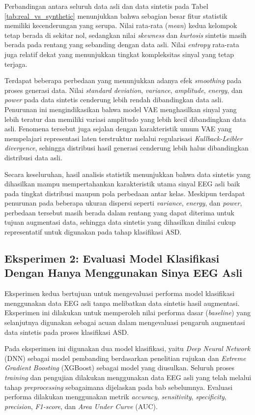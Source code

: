 Perbandingan antara seluruh data asli dan data sintetis pada Tabel \ref{tab:real_vs_synthetic} menunjukkan bahwa sebagian besar fitur statistik memiliki kecenderungan yang serupa. Nilai rata-rata (\textit{mean}) kedua kelompok tetap berada di sekitar nol, sedangkan nilai \textit{skewness} dan \textit{kurtosis} sintetis masih berada pada rentang yang sebanding dengan data asli. Nilai \textit{entropy} rata-rata juga relatif dekat yang menunjukkan tingkat kompleksitas sinyal yang tetap terjaga.

Terdapat beberapa perbedaan yang menunjukkan adanya efek \textit{smoothing} pada proses generasi data. Nilai \textit{standard deviation}, \textit{variance}, \textit{amplitude}, \textit{energy}, dan \textit{power} pada data sintetis cenderung lebih rendah dibandingkan data asli. Penurunan ini mengindikasikan bahwa model VAE menghasilkan sinyal yang lebih teratur dan memiliki variasi amplitudo yang lebih kecil dibandingkan data asli. Fenomena tersebut juga sejalan dengan karakteristik umum VAE yang mempelajari representasi laten terstruktur melalui regularisasi \textit{Kullback-Leibler divergence}, sehingga distribusi hasil generasi cenderung lebih halus dibandingkan distribusi data asli.

Secara keseluruhan, hasil analisis statistik menunjukkan bahwa data sintetis yang dihasilkan mampu mempertahankan karakteristik utama sinyal EEG asli baik pada tingkat distribusi maupun pola perbedaan antar kelas. Meskipun terdapat penurunan pada beberapa ukuran dispersi seperti \textit{variance}, \textit{energy}, dan \textit{power}, perbedaan tersebut masih berada dalam rentang yang dapat diterima untuk tujuan augmentasi data, sehingga data sintetis yang dihasilkan dinilai cukup representatif untuk digunakan pada tahap klasifikasi ASD.


\subsection{Eksperimen 2: Evaluasi Model Klasifikasi Dengan Hanya Menggunakan Sinya EEG Asli}
Eksperimen kedua bertujuan untuk mengevaluasi performa model klasifikasi menggunakan data EEG asli tanpa melibatkan data sintetis hasil augmentasi. Eksperimen ini dilakukan untuk memperoleh nilai performa dasar (\textit{baseline}) yang selanjutnya digunakan sebagai acuan dalam mengevaluasi pengaruh augmentasi data sintetis pada proses klasifikasi ASD.

Pada eksperimen ini digunakan dua model klasifikasi, yaitu \textit{Deep Neural Network} (DNN) sebagai model pembanding berdasarkan penelitian rujukan dan \textit{Extreme Gradient Boosting} (XGBoost) sebagai model yang diusulkan. Seluruh proses \textit{training} dan pengujian dilakukan menggunakan data EEG asli yang telah melalui tahap \textit{preprocessing} sebagaimana dijelaskan pada bab sebelumnya. Evaluasi performa dilakukan menggunakan metrik \textit{accuracy}, \textit{sensitivity}, \textit{specificity}, \textit{precision}, \textit{F1-score}, dan \textit{Area Under Curve} (AUC).

